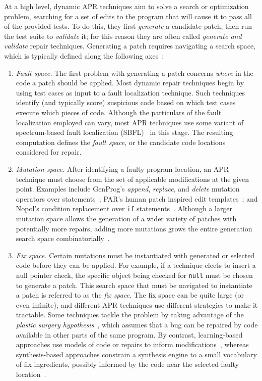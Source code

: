 \documentclass[10pt, conference]{IEEEtran}
\begin{document}
At a high level, dynamic APR techniques aim to solve a search or optimization
problem, searching for a set of edits to the program that will cause it to pass
all of the provided tests. To do this, they first \emph{generate} a candidate
patch, then run the test suite to \emph{validate} it; for this reason they are
often called \emph{generate and validate} repair techniques. Generating a patch
requires navigating a search space, which is typically defined along the
following axes~\cite{ae,sqjo}:
\begin{enumerate}[wide]

\item \emph{Fault space.} The first problem with generating a patch concerns
  \emph{where} in the code a patch should be applied. Most dynamic repair
  techniques begin by using test cases as input to a fault localization
  technique. Such techniques identify (and typically score) suspicious code
  based on which test cases execute which pieces of code. Although the
  particulars of the fault localization employed can vary, most APR techniques
  use some variant of spectrum-based fault localization (SBFL)~\cite{ochiai} in
  this stage. The resulting computation defines the \emph{fault space}, or the
  candidate code locations considered for repair.

\item \emph{Mutation space.} After identifying a faulty program location, an APR
  technique must choose from the set of applicable modifications at the given
  point. Examples include GenProg's \emph{append}, \emph{replace}, and
  \emph{delete} mutation operators over statements~\cite{genprog-operators};
  PAR's human patch inspired edit templates~\cite{par}; and Nopol's condition
  replacement over \texttt{if} statements~\cite{Xuan17}. Although a larger
  mutation space allows the generation of a wider variety of patches with
  potentially more repairs, adding more mutations grows the entire generation
  search space combinatorially~\cite{long-search-spaces}.

\item \emph{Fix space.} Certain mutations must be instantiated with generated or
  selected code before they can be applied. For example, if a technique elects
  to insert a null pointer check, the specific object being checked for
  \texttt{null} must be chosen to generate a patch. This search space that must
  be navigated to instantiate a patch is referred to as the \emph{fix space}.
  The fix space can be quite large (or even infinite), and different APR
  techniques use different strategies to make it tractable. Some techniques
  tackle the problem by taking advantage of the \emph{plastic surgery
    hypothesis}~\cite{plastic}, which assumes that a bug can be repaired by code
  available in other parts of the same program. By contrast, learning-based
  approaches use models of code or repairs to inform
  modifications~\cite{prophet}, whereas synthesis-based approaches constrain a
  synthesis engine to a small vocabulary of fix ingredients, possibly informed
  by the code near the selected faulty location~\cite{angelix,s3}.
\end{enumerate}
\end{document}

